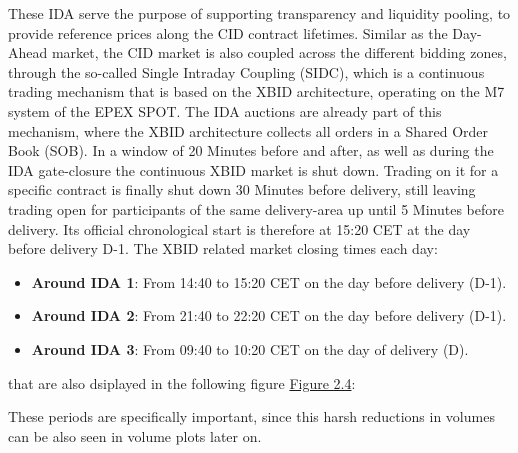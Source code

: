 \documentclass[12pt,a4paper]{cau_thesis}
\begin{document}
These IDA serve the purpose of supporting transparency and liquidity pooling, to
provide reference prices along the CID contract lifetimes. Similar as the
Day-Ahead market, the CID market is also coupled across the different bidding
zones, through the so-called Single Intraday Coupling (SIDC), which is a continuous
trading mechanism that is based on the XBID architecture, operating on
the M7 system of the EPEX SPOT. The IDA auctions are already part of this mechanism,
where the XBID architecture collects all orders in a Shared Order Book (SOB).
In a window of 20 Minutes before and after, as well as during the IDA gate-closure the continuous
XBID market is shut down.
Trading on it for a specific contract is finally shut down 30 Minutes before delivery,
still leaving trading open for participants of the same delivery-area up until 5 Minutes before delivery.
Its official chronological start is therefore at 15:20 CET at the day before delivery D-1.
The XBID related market closing times each day:
\begin{itemize}
    \item \textbf{Around IDA 1}: From 14:40 to 15:20 CET on the day before delivery (D-1).
    \item \textbf{Around IDA 2}: From 21:40 to 22:20 CET on the day before delivery (D-1).
    \item \textbf{Around IDA 3}: From 09:40 to 10:20 CET on the day of delivery (D).
\end{itemize}
that are also dsiplayed in the following figure \hyperref[fig:ida_acutions_xbid_closure]{Figure 2.4}:
\begin{figure}[htbp]
    \vspace*{0.5cm}
    \centering
    \label{fig:ida_acutions_xbid_closure}
\end{figure}
These periods are specifically important, since this harsh reductions
in volumes can be also seen in volume plots later on.
\end{document}
